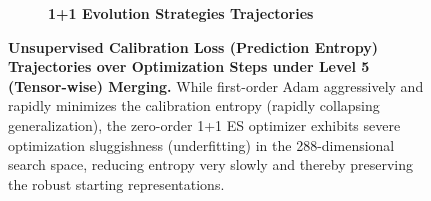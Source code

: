 \documentclass{article}
\theoremstyle{plain}
\theoremstyle{definition}
\theoremstyle{remark}
\begin{document}
\begin{figure}[h]
\begin{subfigure}[b]{0.48\textwidth}
\caption{\textbf{1+1 Evolution Strategies Trajectories}}
\label{fig:loss_es}
\end{subfigure}
\caption{\textbf{Unsupervised Calibration Loss (Prediction Entropy) Trajectories over Optimization Steps under Level 5 (Tensor-wise) Merging.} While first-order Adam aggressively and rapidly minimizes the calibration entropy (rapidly collapsing generalization), the zero-order 1+1 ES optimizer exhibits severe optimization sluggishness (underfitting) in the 288-dimensional search space, reducing entropy very slowly and thereby preserving the robust starting representations.}
\label{fig:calibration_loss_curves}
\vskip 0.1in
\end{figure}
\end{document}

